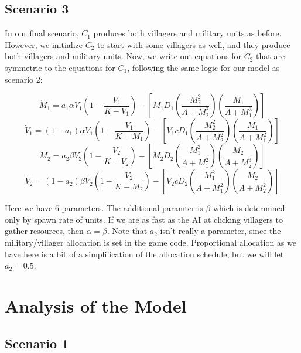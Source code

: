 \documentclass[12pt]{article}
\begin{document}
\subsection{Scenario 3}

 In our final scenario, $C_1$ produces both villagers and military units as before. However, we initialize $C_2$ to start with some villagers as well, and they produce both villagers and military units. Now, we write out equations for $C_2$ that are symmetric to the equations for $C_1$, following the same logic for our model as scenario 2: 

$$\dot M_1 =a_1 \alpha V_1(1-\frac{V_1}{K-V_1})-[M_1D_1(\frac{M_2^2}{A+M_2^2})(\frac{M_1}{A+M_1^3})]$$
$$\dot V_1=(1 - a_1) \alpha V_1(1-\frac{V_1}{K-M_1})-[V_1c D_1(\frac{M_2^2}{A+M_2^2})(\frac{M_1}{A +M_1^2})]$$
$$\dot M_2=a_2 \beta V_2(1-\frac{V_2}{K-V_2})-[M_2 D_2(\frac{M_1^2}{A+M_1^2})(\frac{M_2}{A +M_2^3})] $$
$$\dot V_2=(1 - a_2) \beta V_2(1-\frac{V_2}{K-M_2})-[V_2 c D_2(\frac{M_1^2}{A+M_1^2})(\frac{M_2}{A +M_2^2})] $$

Here we have 6 parameters. The additional paramter is $\beta$ which is determined only by spawn rate of units. If we are as fast as the AI at clicking villagers to gather resources, then $\alpha = \beta$. Note that $a_2$ isn't really a parameter, since the military/villager allocation is set in the game code. Proportional allocation as we have here is a bit of a simplification of the allocation schedule, but we will let $a_2 = 0.5$.

\section{Analysis of the Model}

\subsection{Scenario 1}
\end{document}
